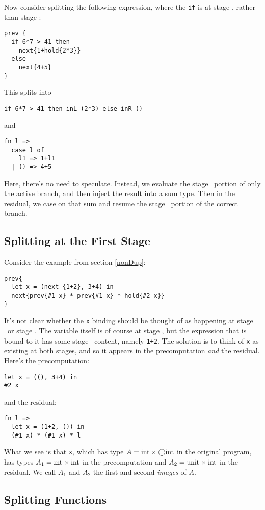 Now consider splitting the following expression, where the {\tt if} is at stage \bbone, rather than stage \bbtwo:
\begin{lstlisting}
prev {
  if 6*7 > 41 then
    next{1+hold{2*3}}
  else 
    next{4+5}
}
\end{lstlisting}
This splits into
\begin{lstlisting}
if 6*7 > 41 then inL (2*3) else inR ()
\end{lstlisting}
and
\begin{lstlisting}
fn l => 
  case l of
    l1 => 1+l1
  | () => 4+5
\end{lstlisting}
Here, there's no need to speculate.
Instead, we evaluate the stage \bbone\ portion of only the active branch, and then inject the result into a sum type.
Then in the residual, we case on that sum and resume the stage \bbtwo\ portion of the correct branch.

\subsection {Splitting at the First Stage}

Consider the example from section \ref{nonDup}:

\begin{lstlisting} 
prev{
  let x = (next {1+2}, 3+4) in
  next{prev{#1 x} * prev{#1 x} * hold{#2 x}}
}
\end{lstlisting}

It's not clear whether the {\tt x} binding should be thought of as happening at stage \bbone\ or stage \bbtwo.
The variable itself is of course at stage \bbone, but the expression that is bound to it has some stage \bbtwo\ content, namely \verb|1+2|.
The solution is to think of {\tt x} as existing at both stages, and so it appears in the precomputation {\em and} the residual.
Here's the precomputation:
\begin{lstlisting} 
let x = ((), 3+4) in 
#2 x
\end{lstlisting}
and the residual:
\begin{lstlisting} 
fn l =>
  let x = (1+2, ()) in 
  (#1 x) * (#1 x) * l
\end{lstlisting}
What we see is that {\tt x}, which has type $A = {\rm int} \times \bigcirc {\rm int}$ in the original program, 
has types $A_1 = {\rm int} \times {\rm int}$ in the precomputation and $A_2 = {\rm unit} \times {\rm int}$ in the residual.
We call $A_1$ and $A_2$ the first and second {\em images} of $A$.

\subsection {Splitting Functions}

